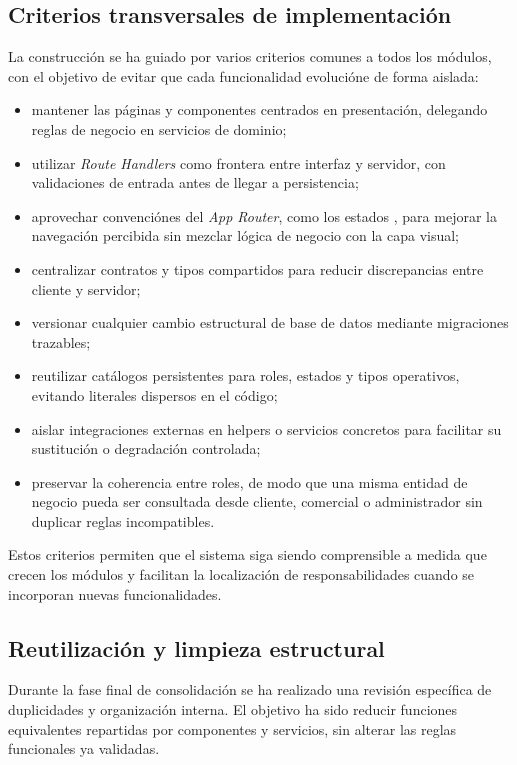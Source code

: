 \subsection{Criterios transversales de implementación}

La construcción se ha guiado por varios criterios comunes a todos los módulos, con el objetivo de evitar que cada funcionalidad evolucióne de forma aislada:

\begin{itemize}
    \item mantener las páginas y componentes centrados en presentación, delegando reglas de negocio en servicios de dominio;
    \item utilizar \textit{Route Handlers} como frontera entre interfaz y servidor, con validaciones de entrada antes de llegar a persistencia;
    \item aprovechar convenciónes del \textit{App Router}, como los estados , para mejorar la navegación percibida sin mezclar lógica de negocio con la capa visual;
    \item centralizar contratos y tipos compartidos para reducir discrepancias entre cliente y servidor;
    \item versionar cualquier cambio estructural de base de datos mediante migraciones trazables;
    \item reutilizar catálogos persistentes para roles, estados y tipos operativos, evitando literales dispersos en el código;
    \item aislar integraciones externas en helpers o servicios concretos para facilitar su sustitución o degradación controlada;
    \item preservar la coherencia entre roles, de modo que una misma entidad de negocio pueda ser consultada desde cliente, comercial o administrador sin duplicar reglas incompatibles.
\end{itemize}

Estos criterios permiten que el sistema siga siendo comprensible a medida que crecen los módulos y facilitan la localización de responsabilidades cuando se incorporan nuevas funcionalidades.

\subsection{Reutilización y limpieza estructural}

Durante la fase final de consolidación se ha realizado una revisión específica de duplicidades y organización interna. El objetivo ha sido reducir funciones equivalentes repartidas por componentes y servicios, sin alterar las reglas funcionales ya validadas.

